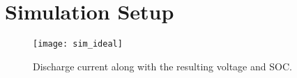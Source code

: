 \documentclass[../zhang_thesis.tex]{subfiles}
\begin{document}

\section{Simulation Setup}

\begin{figure}
\centering
\texttt{[image: sim\_ideal]}
\caption{Discharge current along with the resulting voltage and SOC.}
\label{fig:idealsim}
\end{figure}
\end{document}
